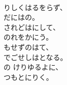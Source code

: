 \documentclass[10pt,b5j]{tarticle} %
\begin{document}
\vspace{1.5em} %
\newcommand{\linespace}{0.5em} %
\newcommand{\blocksize}{0.5\hsize} %
\newcommand{\itemmargin}{3em} %
\begin{enumerate} %
    \setlength{\itemindent}{\itemmargin} %
    \begin{minipage}[c]{\blocksize}
    
        \vspace{\linespace}
        \item~\\
        りしくはるをらず、\\
        だにはの。\\
        されどはにして、\\
        のれをかにう。\\
        もせずのはて、\\
        でごせしはとなる。\\
        の けりゆるよに、\\
        つもとにりく。
        
    \end{minipage}
    \begin{minipage}[c]{\blocksize}
        

\end{minipage}
\end{enumerate}
\end{document}
